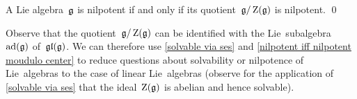 \begin{corollary}
  \label{nilpotent iff nilpotent moudulo center}
  A Lie algebra~$\mathfrak{g}$ is nilpotent if and only if its quotient~$\mathfrak{g}/\operatorname{Z}(\mathfrak{g})$ is nilpotent.
  \qed
\end{corollary}


\begin{remark}
  Observe that the quotient~$\mathfrak{g}/\operatorname{Z}(\mathfrak{g})$ can be identified with the Lie~subalgebra~$\operatorname{ad}(\mathfrak{g})$ of~$\mathfrak{gl}(\mathfrak{g})$.
  We can therefore use \cref{solvable via ses} and \cref{nilpotent iff nilpotent moudulo center} to reduce questions about solvability or nilpotence of Lie~algebras to the case of linear Lie~algebras (observe for the application of \cref{solvable via ses} that the ideal~$\operatorname{Z}(\mathfrak{g})$ is abelian and hence solvable).
\end{remark}


